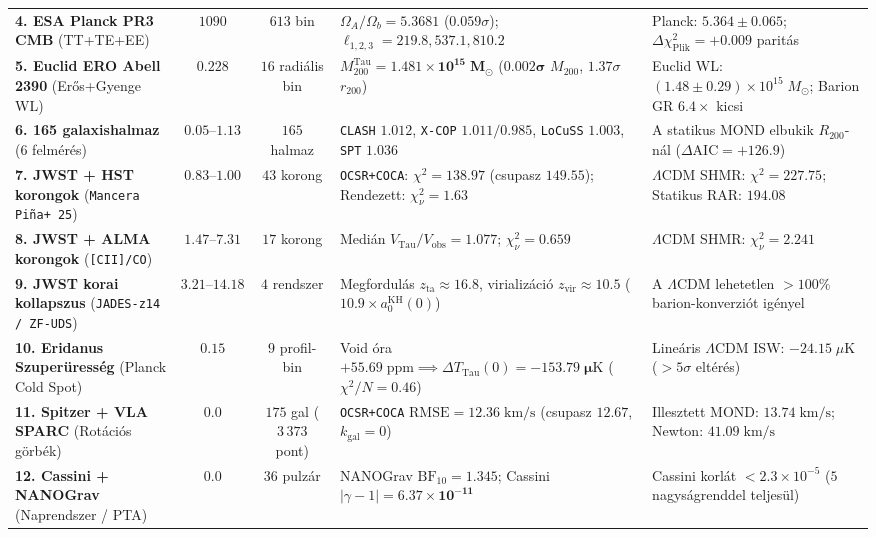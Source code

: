 \documentclass[11pt,a4paper]{article}
\begin{document}
\begin{table}[H]
{\begin{tabular}{L{3.6cm}ccL{4.5cm}L{3.9cm}}
\addlinespace[2pt]
\textbf{4. ESA Planck PR3 CMB} (TT+TE+EE) & $1090$ & $613$ bin & $\Omega_A/\Omega_b = \mathbf{5.3681}$ ($0.059\sigma$); $\ell_{1,2,3} = 219.8, 537.1, 810.2$ & Planck: $5.364 \pm 0.065$; $\Delta\chi^2_{\mathrm{Plik}} = \mathbf{+0.009}$ paritás \\
\addlinespace[2pt]
\textbf{5. Euclid ERO Abell 2390} (Erős+Gyenge WL) & $0.228$ & $16$ radiális bin & $M_{200}^{\mathrm{Tau}} = \mathbf{1.481 \times 10^{15}\;M_\odot}$ ($\mathbf{0.002\sigma}$ $M_{200}$, $1.37\sigma$ $r_{200}$) & Euclid WL: $(1.48 \pm 0.29)\times 10^{15}\;M_\odot$; Barion GR $6.4\times$ kicsi \\
\addlinespace[2pt]
\textbf{6. 165 galaxishalmaz} ($6$ felmérés) & $0.05\text{--}1.13$ & $165$ halmaz & \texttt{CLASH} $1.012$, \texttt{X-COP} $1.011/0.985$, \texttt{LoCuSS} $1.003$, \texttt{SPT} $1.036$ & A statikus MOND elbukik $R_{200}$-nál ($\Delta\mathrm{AIC} = +126.9$) \\
\addlinespace[2pt]
\textbf{7. JWST + HST korongok} (\texttt{Mancera Pi\~na+ 25}) & $0.83\text{--}1.00$ & $43$ korong & \texttt{OCSR+COCA}: $\chi^2 = \mathbf{138.97}$ (csupasz $149.55$); Rendezett: $\chi^2_\nu = \mathbf{1.63}$ & $\Lambda$CDM SHMR: $\chi^2 = \mathbf{227.75}$; Statikus RAR: $194.08$ \\
\addlinespace[2pt]
\textbf{8. JWST + ALMA korongok} (\texttt{[CII]/CO}) & $1.47\text{--}7.31$ & $17$ korong & Medián $V_{\mathrm{Tau}}/V_{\mathrm{obs}} = \mathbf{1.077}$; $\chi^2_\nu = \mathbf{0.659}$ & $\Lambda$CDM SHMR: $\chi^2_\nu = \mathbf{2.241}$ \\
\addlinespace[2pt]
\textbf{9. JWST korai kollapszus} (\texttt{JADES-z14 / ZF-UDS}) & $3.21\text{--}14.18$ & $4$ rendszer & Megfordulás $z_{\mathrm{ta}} \approx 16.8$, virializáció $z_{\mathrm{vir}} \approx \mathbf{10.5}$ ($10.9\times a_0^{\mathrm{KH}}(0)$) & A $\Lambda$CDM lehetetlen $>100\%$ barion-konverziót igényel \\
\addlinespace[2pt]
\textbf{10. Eridanus Szuperüresség} (Planck Cold Spot) & $0.15$ & $9$ profil-bin & Void óra $+55.69\;\mathrm{ppm} \implies \Delta T_{\mathrm{Tau}}(0) = \mathbf{-153.79\;\mu\mathrm{K}}$ ($\chi^2/N = \mathbf{0.46}$) & Lineáris $\Lambda$CDM ISW: $-24.15\;\mu\mathrm{K}$ ($>5\sigma$ eltérés) \\
\addlinespace[2pt]
\textbf{11. Spitzer + VLA SPARC} (Rotációs görbék) & $0.0$ & $175$ gal ($3\,373$ pont) & \texttt{OCSR+COCA} $\mathrm{RMSE} = \mathbf{12.36\;\mathrm{km/s}}$ (csupasz $12.67$, $k_{\mathrm{gal}} = 0$) & Illesztett MOND: $13.74\;\mathrm{km/s}$; Newton: $41.09\;\mathrm{km/s}$ \\
\addlinespace[2pt]
\textbf{12. Cassini + NANOGrav} (Naprendszer / PTA) & $0.0$ & $36$ pulzár & NANOGrav $\mathrm{BF}_{10} = \mathbf{1.345}$; Cassini $|\gamma - 1| = \mathbf{6.37\times 10^{-11}}$ & Cassini korlát $< 2.3\times 10^{-5}$ ($5$ nagyságrenddel teljesül) \\
\bottomrule
\end{tabular}%
}
\end{table}



\end{document}
